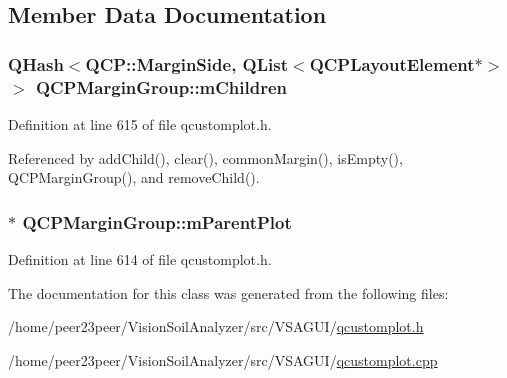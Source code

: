 \subsection{Member Data Documentation}
\hypertarget{class_q_c_p_margin_group_a954bc89ff8958b9bb6a4a0d08ed5fc0f}{}
\subsubsection[{m\+Children}]{\setlength{\rightskip}{0pt plus 5cm}Q\+Hash$<${\bf Q\+C\+P\+::\+Margin\+Side}, Q\+List$<${\bf Q\+C\+P\+Layout\+Element}$\ast$$>$ $>$ Q\+C\+P\+Margin\+Group\+::m\+Children\hspace{0.3cm}{\ttfamily [protected]}}\label{class_q_c_p_margin_group_a954bc89ff8958b9bb6a4a0d08ed5fc0f}


Definition at line 615 of file qcustomplot.\+h.



Referenced by add\+Child(), clear(), common\+Margin(), is\+Empty(), Q\+C\+P\+Margin\+Group(), and remove\+Child().

\hypertarget{class_q_c_p_margin_group_a23cfa29e3cc0f33a59141b77d8c04edf}{}
\subsubsection[{m\+Parent\+Plot}]{$\ast$ Q\+C\+P\+Margin\+Group\+::m\+Parent\+Plot\hspace{0.3cm}{\ttfamily [protected]}}\label{class_q_c_p_margin_group_a23cfa29e3cc0f33a59141b77d8c04edf}


Definition at line 614 of file qcustomplot.\+h.



The documentation for this class was generated from the following files\+:\begin{DoxyCompactItemize}
\item 
/home/peer23peer/\+Vision\+Soil\+Analyzer/src/\+V\+S\+A\+G\+U\+I/\hyperlink{qcustomplot_8h}{qcustomplot.\+h}\item 
/home/peer23peer/\+Vision\+Soil\+Analyzer/src/\+V\+S\+A\+G\+U\+I/\hyperlink{qcustomplot_8cpp}{qcustomplot.\+cpp}\end{DoxyCompactItemize}
